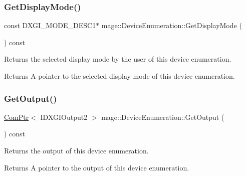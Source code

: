 \subsubsection{\texorpdfstring{Get\+Display\+Mode()}{GetDisplayMode()}}
{\footnotesize\ttfamily const D\+X\+G\+I\+\_\+\+M\+O\+D\+E\+\_\+\+D\+E\+S\+C1$\ast$ mage\+::\+Device\+Enumeration\+::\+Get\+Display\+Mode (\begin{DoxyParamCaption}{ }\end{DoxyParamCaption}) const\hspace{0.3cm}{\ttfamily [noexcept]}}

Returns the selected display mode by the user of this device enumeration.

\begin{DoxyReturn}{Returns}
A pointer to the selected display mode of this device enumeration. 
\end{DoxyReturn}
\hypertarget{classmage_1_1_device_enumeration_a8b3e0b888a0ae7caf1e340d456424416}{}\label{classmage_1_1_device_enumeration_a8b3e0b888a0ae7caf1e340d456424416} 
\subsubsection{\texorpdfstring{Get\+Output()}{GetOutput()}}
{\footnotesize\ttfamily \hyperlink{namespacemage_ae74f374780900893caa5555d1031fd79}{Com\+Ptr}$<$ I\+D\+X\+G\+I\+Output2 $>$ mage\+::\+Device\+Enumeration\+::\+Get\+Output (\begin{DoxyParamCaption}{ }\end{DoxyParamCaption}) const\hspace{0.3cm}{\ttfamily [noexcept]}}

Returns the output of this device enumeration.

\begin{DoxyReturn}{Returns}
A pointer to the output of this device enumeration. 
\end{DoxyReturn}
\hypertarget{classmage_1_1_device_enumeration_acbedeeb225585dc240f8f5be83ac5989}{}\label{classmage_1_1_device_enumeration_acbedeeb225585dc240f8f5be83ac5989} 
